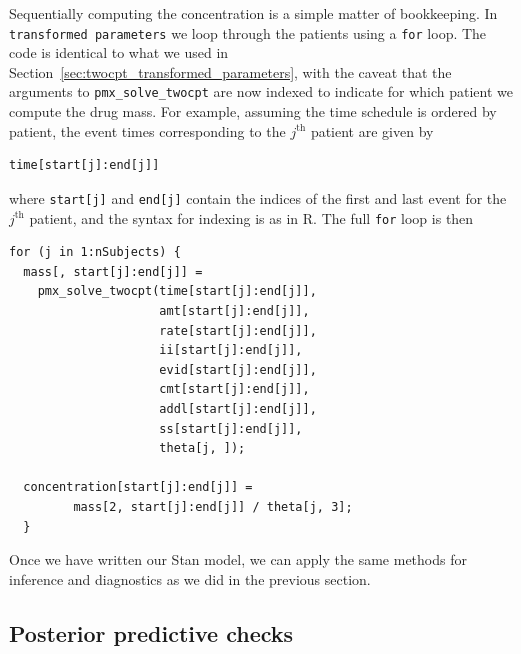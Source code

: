 Sequentially computing the concentration is a simple matter of bookkeeping.
In \texttt{transformed parameters} we loop through the patients using a \texttt{for} loop.
The code is identical to what we used in Section~\ref{sec:twocpt_transformed_parameters},
with the caveat that the arguments to \texttt{pmx\_solve\_twocpt} are now indexed to indicate for which patient we compute the drug mass.
For example, assuming the time schedule is ordered by patient, the event times corresponding to the $j^\mathrm{th}$ patient are given by
\begin{lstlisting}[style=stan, numbers=none]
time[start[j]:end[j]]
\end{lstlisting}
%
where \texttt{start[j]} and \texttt{end[j]} contain the indices of the first and last event for the $j^\mathrm{th}$ patient, and the syntax for indexing is as in R.
The full \texttt{for} loop is then
%
\begin{lstlisting}[style=stan, numbers=none]
for (j in 1:nSubjects) {
  mass[, start[j]:end[j]] = 
    pmx_solve_twocpt(time[start[j]:end[j]],
                     amt[start[j]:end[j]],
                     rate[start[j]:end[j]],
                     ii[start[j]:end[j]],
                     evid[start[j]:end[j]],
                     cmt[start[j]:end[j]],
                     addl[start[j]:end[j]],
                     ss[start[j]:end[j]],
                     theta[j, ]);

  concentration[start[j]:end[j]] = 
         mass[2, start[j]:end[j]] / theta[j, 3];
  }
\end{lstlisting}

Once we have written our Stan model, we can apply the same methods for inference and diagnostics as we did in the previous section.

\subsection{Posterior predictive checks}

